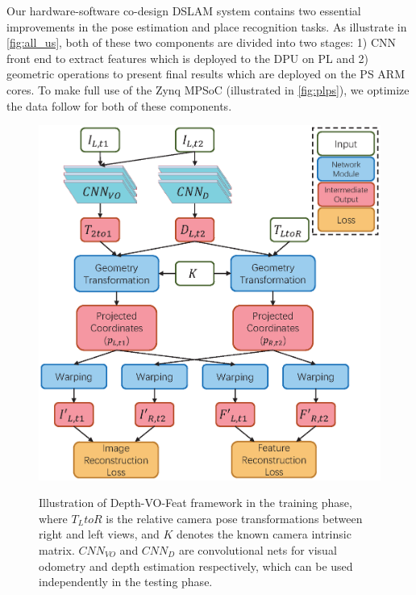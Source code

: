 \label{sec:hardsoft}
Our hardware-software co-design DSLAM system contains two essential improvements in the pose estimation and place recognition tasks. As illustrate in \cref{fig:all_us}, both of these two components are divided into two stages: 1) CNN front end to extract features which is deployed to the DPU on PL and 2) geometric operations to present final results which are deployed on the PS ARM cores. To make full use of the Zynq MPSoC (illustrated in \cref{fig:plps}), we optimize the data follow for both of these components.

\begin{figure}[t]  
    \centering  
    {\includegraphics[width=0.85\linewidth]{fig/depth_vo_feat.eps}\label{fig:dvo}}
    \caption{Illustration of Depth-VO-Feat framework in the training phase, where $T_LtoR$ is the relative camera pose transformations between right and left views, and $K$ denotes the known camera intrinsic matrix. $CNN_{VO}$ and $CNN_D$ are convolutional nets for visual odometry and depth estimation respectively, which can be used independently in the testing phase. }
\end{figure}

